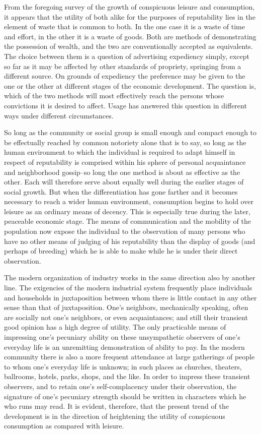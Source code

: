 \documentclass[12pt]{report}
\begin{document}
From the foregoing survey of the growth of conspicuous leisure and
consumption, it appears that the utility of both alike for the purposes
of reputability lies in the element of waste that is common to both.
In the one case it is a waste of time and effort, in the other it is
a waste of goods. Both are methods of demonstrating the possession of
wealth, and the two are conventionally accepted as equivalents. The
choice between them is a question of advertising expediency simply,
except so far as it may be affected by other standards of propriety,
springing from a different source. On grounds of expediency the
preference may be given to the one or the other at different stages of
the economic development. The question is, which of the two methods will
most effectively reach the persons whose convictions it is desired
to affect. Usage has answered this question in different ways under
different circumstances.

So long as the community or social group is small enough and compact
enough to be effectually reached by common notoriety alone that is
to say, so long as the human environment to which the individual is
required to adapt himself in respect of reputability is comprised within
his sphere of personal acquaintance and neighborhood gossip--so long the
one method is about as effective as the other. Each will therefore serve
about equally well during the earlier stages of social growth. But when
the differentiation has gone farther and it becomes necessary to reach
a wider human environment, consumption begins to hold over leisure as
an ordinary means of decency. This is especially true during the later,
peaceable economic stage. The means of communication and the mobility
of the population now expose the individual to the observation of many
persons who have no other means of judging of his reputability than
the display of goods (and perhaps of breeding) which he is able to make
while he is under their direct observation.

The modern organization of industry works in the same direction also by
another line. The exigencies of the modern industrial system frequently
place individuals and households in juxtaposition between whom there
is little contact in any other sense than that of juxtaposition.
One's neighbors, mechanically speaking, often are socially not one's
neighbors, or even acquaintances; and still their transient good opinion
has a high degree of utility. The only practicable means of impressing
one's pecuniary ability on these unsympathetic observers of one's
everyday life is an unremitting demonstration of ability to pay. In
the modern community there is also a more frequent attendance at large
gatherings of people to whom one's everyday life is unknown; in such
places as churches, theaters, ballrooms, hotels, parks, shops, and the
like. In order to impress these transient observers, and to retain
one's self-complacency under their observation, the signature of one's
pecuniary strength should be written in characters which he who runs
may read. It is evident, therefore, that the present trend of
the development is in the direction of heightening the utility of
conspicuous consumption as compared with leisure.
\end{document}
